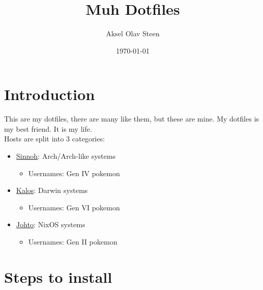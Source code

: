 \documentclass[11pt]{article}
\author{Aksel Olav Steen}
\date{\today}
\title{Muh Dotfiles}
\begin{document}
\maketitle
\section{Introduction}
\label{sec:org4c50468}
This are my dotfiles, there are many like them, but these are mine. My
dotfiles is my best friend. It is my life. \\

Hosts are split into 3 categories:
\begin{itemize}
\item \href{./hosts/sinnoh/README.org}{Sinnoh}: Arch/Arch-like systems
\begin{itemize}
\item Usernames: Gen IV pokemon
\end{itemize}
\item \href{./hosts/kalos/README.org}{Kalos}: Darwin systems
\begin{itemize}
\item Usernames: Gen VI pokemon
\end{itemize}
\item \href{./hosts/johto/README.org}{Johto}: NixOS systems
\begin{itemize}
\item Usernames: Gen II pokemon
\end{itemize}
\end{itemize}
\section{Steps to install}
\label{sec:orgb7b73e4}
\end{document}
